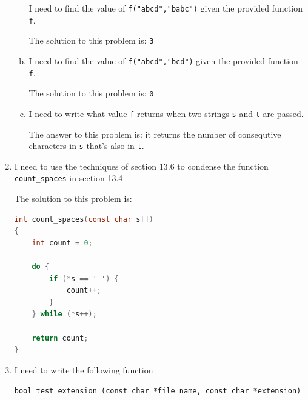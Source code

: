 \documentclass[12pt]{article}
\begin{document}
\begin{enumerate}[1.]
\begin{enumerate}[a)]
        I need to find the value of \texttt{f("abcd","babc")} given the provided function \texttt{f}.

        \bigskip

        The solution to this problem is: \texttt{3}

        \bigskip

        \item

        I need to find the value of \texttt{f("abcd","bcd")} given the provided function \texttt{f}.

        \bigskip

        The solution to this problem is: \texttt{0}

        \bigskip

        \item

        I need to write what value \texttt{f} returns when two strings \texttt{s}
        and \texttt{t} are passed.

        \bigskip

        The answer to this problem is: it returns the number of consequtive characters in \texttt{s} that's also in \texttt{t}.

    \end{enumerate}

    \item

    I need to use the techniques of section 13.6 to condense the function \texttt{count\_spaces}
    in section 13.4

    \bigskip

    The solution to this problem is:

    \bigskip

\begin{lstlisting}[language=c]
int count_spaces(const char s[])
{
    int count = 0;

    do {
        if (*s == ' ') {
            count++;
        }
    } while (*s++);

    return count;
}
\end{lstlisting}

    \item

    I need to write the following function

    \bigskip

    \texttt{bool test\_extension (const char *file\_name, const char *extension)}

    \bigskip


\end{enumerate}
\end{document}
